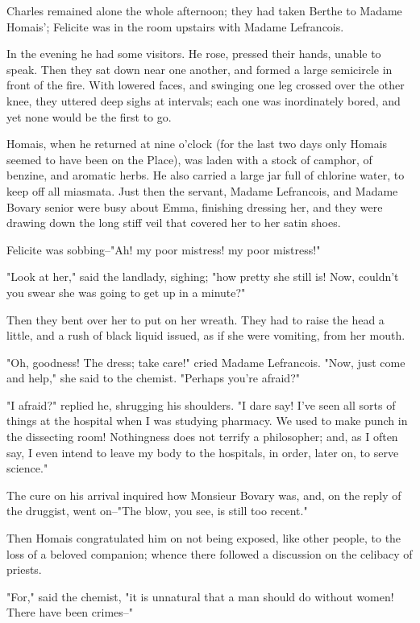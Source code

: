 \documentclass{tufte-book}
\begin{document}
Charles remained alone the whole afternoon; they had taken Berthe
to Madame Homais'; Felicite was in the room upstairs with Madame
Lefrancois.

In the evening he had some visitors. He rose, pressed their hands,
unable to speak. Then they sat down near one another, and formed a large
semicircle in front of the fire. With lowered faces, and swinging one
leg crossed over the other knee, they uttered deep sighs at intervals;
each one was inordinately bored, and yet none would be the first to go.

Homais, when he returned at nine o'clock (for the last two days only
Homais seemed to have been on the Place), was laden with a stock of
camphor, of benzine, and aromatic herbs. He also carried a large jar
full of chlorine water, to keep off all miasmata. Just then the servant,
Madame Lefrancois, and Madame Bovary senior were busy about Emma,
finishing dressing her, and they were drawing down the long stiff veil
that covered her to her satin shoes.

Felicite was sobbing--"Ah! my poor mistress! my poor mistress!"

"Look at her," said the landlady, sighing; "how pretty she still is!
Now, couldn't you swear she was going to get up in a minute?"

Then they bent over her to put on her wreath. They had to raise the head
a little, and a rush of black liquid issued, as if she were vomiting,
from her mouth.

"Oh, goodness! The dress; take care!" cried Madame Lefrancois. "Now,
just come and help," she said to the chemist. "Perhaps you're afraid?"

"I afraid?" replied he, shrugging his shoulders. "I dare say! I've seen
all sorts of things at the hospital when I was studying pharmacy. We
used to make punch in the dissecting room! Nothingness does not terrify
a philosopher; and, as I often say, I even intend to leave my body to
the hospitals, in order, later on, to serve science."

The cure on his arrival inquired how Monsieur Bovary was, and, on
the reply of the druggist, went on--"The blow, you see, is still too
recent."

Then Homais congratulated him on not being exposed, like other people,
to the loss of a beloved companion; whence there followed a discussion
on the celibacy of priests.

"For," said the chemist, "it is unnatural that a man should do without
women! There have been crimes--"
\end{document}
